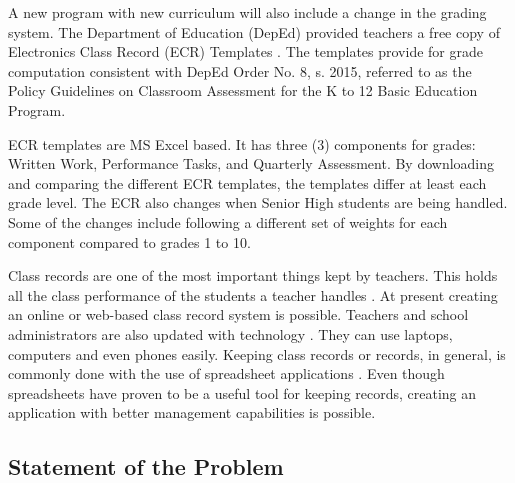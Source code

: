 \documentclass[11pt,a4paper,titlepage]{article}
\begin{document}
A new program with new curriculum will also include a change in the grading system. The Department of Education (DepEd) provided teachers a free copy of Electronics Class Record (ECR) Templates \cite{depEd}. The templates provide for grade computation consistent with DepEd Order No. 8, s. 2015, referred to as the Policy Guidelines on Classroom Assessment for the K to 12 Basic Education Program. 

ECR templates are MS Excel based. It has three (3) components for grades: Written Work, Performance Tasks, and Quarterly Assessment. By downloading and comparing the different ECR templates, the templates differ at least each grade level. The ECR also changes when Senior High students are being handled. Some of the changes include following a different set of weights for each component compared to grades 1 to 10.

Class records are one of the most important things kept by teachers. This holds all the class performance of the students a teacher handles \cite{Dellosa}. At present creating an online or web-based class record system is possible. Teachers and school administrators are also updated with technology \cite{Dellosa}. They can use laptops, computers and even phones easily. Keeping class records or records, in general, is commonly done with the use of spreadsheet applications \cite{Dellosa}. Even though spreadsheets have proven to be a useful tool for keeping records, creating an application with better management capabilities is possible.

\subsection{Statement of the Problem}

\end{document}
